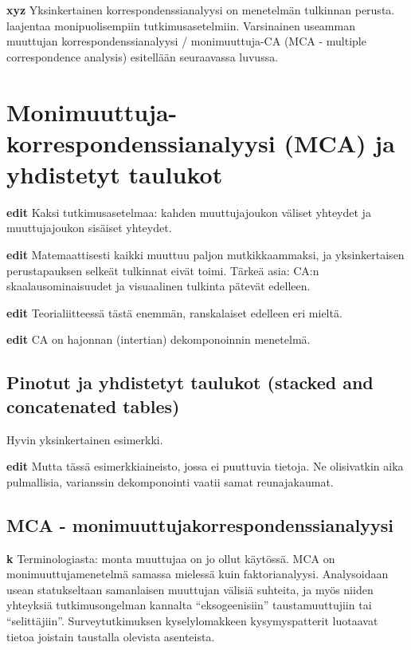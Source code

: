 \documentclass[
  finnish,
]{book}
\begin{document}
\textbf{xyz} Yksinkertainen korrespondenssianalyysi on menetelmän tulkinnan perusta.
laajentaa monipuolisempiin tutkimusasetelmiin. Varsinainen useamman muuttujan
korrespondenssianalyysi / monimuuttuja-CA (MCA - multiple correspondence analysis)
esitellään seuraavassa luvussa.

\hypertarget{monimuuttuja-korrespondenssianalyysi-mca-ja-yhdistetyt-taulukot}{%
\chapter{Monimuuttuja-korrespondenssianalyysi (MCA) ja yhdistetyt taulukot}\label{monimuuttuja-korrespondenssianalyysi-mca-ja-yhdistetyt-taulukot}}

\textbf{edit} Kaksi tutkimusasetelmaa: kahden muuttujajoukon väliset yhteydet ja
muuttujajoukon sisäiset yhteydet.

\textbf{edit} Matemaattisesti kaikki muuttuu paljon mutkikkaammaksi, ja yksinkertaisen
perustapauksen selkeät tulkinnat eivät toimi. Tärkeä asia: CA:n skaalausominaisuudet ja
visuaalinen tulkinta pätevät edelleen.

\textbf{edit} Teorialiitteessä tästä enemmän, ranskalaiset edelleen eri mieltä.

\textbf{edit} CA on hajonnan (intertian) dekomponoinnin menetelmä.

\hypertarget{pinotut-ja-yhdistetyt-taulukot-stacked-and-concatenated-tables}{%
\section{Pinotut ja yhdistetyt taulukot (stacked and concatenated tables)}\label{pinotut-ja-yhdistetyt-taulukot-stacked-and-concatenated-tables}}

Hyvin yksinkertainen esimerkki.

\textbf{edit} Mutta tässä esimerkkiaineisto, jossa ei puuttuvia tietoja. Ne olisivatkin
aika pulmallisia, varianssin dekomponointi vaatii samat reunajakaumat.

\hypertarget{mca---monimuuttujakorrespondenssianalyysi}{%
\section{MCA - monimuuttujakorrespondenssianalyysi}\label{mca---monimuuttujakorrespondenssianalyysi}}

\textbf{k} Terminologiasta: monta muuttujaa on jo ollut käytössä. MCA on monimuuttujamenetelmä
samassa mielessä kuin faktorianalyysi. Analysoidaan usean statukseltaan samanlaisen
muuttujan välisiä suhteita, ja myös niiden yhteyksiä tutkimusongelman kannalta
``eksogeenisiin'' taustamuuttujiin tai ``selittäjiin''. Surveytutkimuksen kyselylomakkeen
kysymyspatterit luotaavat tietoa joistain taustalla olevista asenteista.
\end{document}
